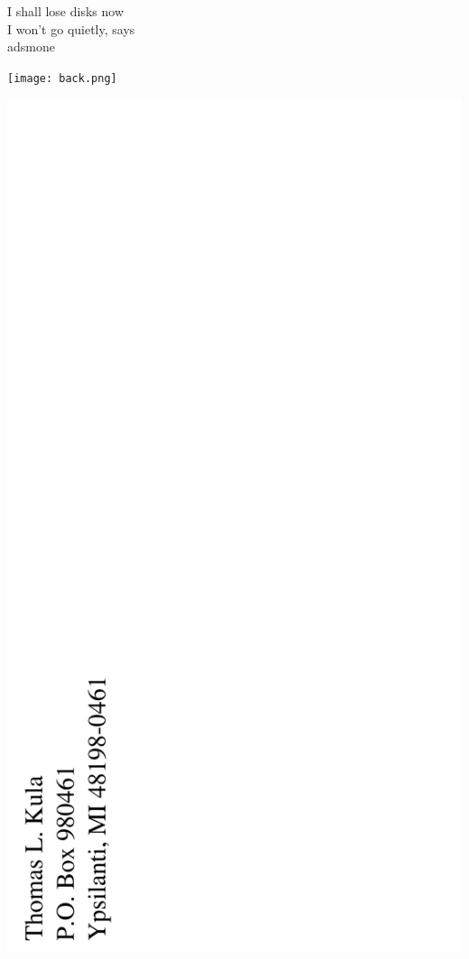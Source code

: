 \documentclass[12pt]{article}
\begin{document}
I shall lose disks now \\
I won't go quietly, says \\
adsmone


\newpage

\texttt{[image: back.png]}

\newpage

\includegraphics{../includes/backpage.png}
\end{document}
